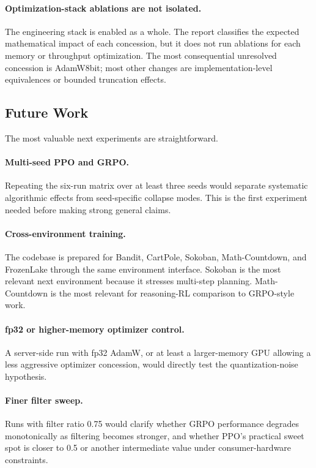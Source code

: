 \paragraph{Optimization-stack ablations are not isolated.}
The engineering stack is enabled as a whole. The report classifies the expected mathematical impact of each concession, but it does not run ablations for each memory or throughput optimization. The most consequential unresolved concession is AdamW8bit; most other changes are implementation-level equivalences or bounded truncation effects.

\subsection{Future Work}

The most valuable next experiments are straightforward.

\paragraph{Multi-seed PPO and GRPO.}
Repeating the six-run matrix over at least three seeds would separate systematic algorithmic effects from seed-specific collapse modes. This is the first experiment needed before making strong general claims.

\paragraph{Cross-environment training.}
The codebase is prepared for Bandit, CartPole, Sokoban, Math-Countdown, and FrozenLake through the same environment interface. Sokoban is the most relevant next environment because it stresses multi-step planning. Math-Countdown is the most relevant for reasoning-RL comparison to GRPO-style work.

\paragraph{fp32 or higher-memory optimizer control.}
A server-side run with fp32 AdamW, or at least a larger-memory GPU allowing a less aggressive optimizer concession, would directly test the quantization-noise hypothesis.

\paragraph{Finer filter sweep.}
Runs with filter ratio 0.75 would clarify whether GRPO performance degrades monotonically as filtering becomes stronger, and whether PPO's practical sweet spot is closer to 0.5 or another intermediate value under consumer-hardware constraints.

